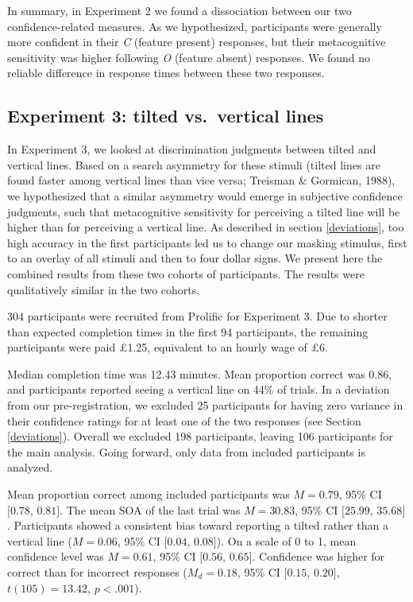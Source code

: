 \documentclass[12pt,twoside]{reedthesis}
\begin{document}
In summary, in Experiment 2 we found a dissociation between our two confidence-related measures. As we hypothesized, participants were generally more confident in their \emph{C} (feature present) responses, but their metacognitive sensitivity was higher following \emph{O} (feature absent) responses. We found no reliable difference in response times between these two responses.

\hypertarget{experiment-3-tilted-vs.-vertical-lines}{%
\subsection{Experiment 3: tilted vs.~vertical lines}\label{experiment-3-tilted-vs.-vertical-lines}}

In Experiment 3, we looked at discrimination judgments between tilted and vertical lines. Based on a search asymmetry for these stimuli (tilted lines are found faster among vertical lines than vice versa; Treisman \& Gormican, 1988), we hypothesized that a similar asymmetry would emerge in subjective confidence judgments, such that metacognitive sensitivity for perceiving a tilted line will be higher than for perceiving a vertical line. As described in section \ref{deviations}, too high accuracy in the first participants led us to change our masking stimulus, first to an overlay of all stimuli and then to four dollar signs. We present here the combined results from these two cohorts of participants. The results were qualitatively similar in the two cohorts.

304 participants were recruited from Prolific for Experiment 3. Due to shorter than expected completion times in the first 94 participants, the remaining participants were paid £1.25, equivalent to an hourly wage of £6.

Median completion time was 12.43 minutes. Mean proportion correct was 0.86, and participants reported seeing a vertical line on 44\% of trials. In a deviation from our pre-registration, we excluded 25 participants for having zero variance in their confidence ratings for at least one of the two responses (see Section \ref{deviations}). Overall we excluded 198 participants, leaving 106 participants for the main analysis. Going forward, only data from included participants is analyzed.

Mean proportion correct among included participants was \(M = 0.79\), 95\% CI \([0.78\), \(0.81]\). The mean SOA of the last trial was \(M = 30.83\), 95\% CI \([25.99\), \(35.68]\). Participants showed a consistent bias toward reporting a tilted rather than a vertical line (\(M = 0.06\), 95\% CI \([0.04\), \(0.08]\)). On a scale of 0 to 1, mean confidence level was \(M = 0.61\), 95\% CI \([0.56\), \(0.65]\). Confidence was higher for correct than for incorrect responses (\(M_d = 0.18\), 95\% CI \([0.15\), \(0.20]\), \(t(105) = 13.42\), \(p < .001\)).
\end{document}
